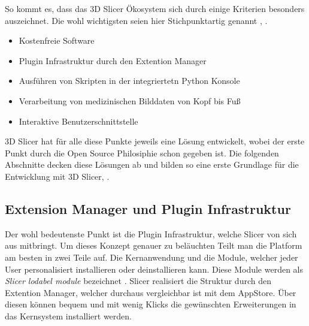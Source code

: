 So kommt es, dass das 3D Slicer Ökosystem sich durch einige Kriterien besonders
auszeichnet. Die wohl wichtigsten seien hier Stichpunktartig genannt \citep[vgl.][]{slicer2024},
\citep[vgl.][]{fedorov2012slicer}.

\begin{itemize}
	\item Kostenfreie Software

	\item Plugin Infrastruktur durch den Extention Manager

	\item Ausführen von Skripten in der integriertetn Python Konsole

	\item Verarbeitung von medizinischen Bilddaten von Kopf bis Fuß

	\item Interaktive Benutzerschnittstelle
\end{itemize}

3D Slicer hat für alle diese Punkte jeweils eine Lösung entwickelt, wobei der
erste Punkt durch die Open Source Philosiphie schon gegeben ist. Die folgenden Abschnitte
decken diese Lösungen ab und bilden so eine erste Grundlage für die Entwicklung mit
3D Slicer\citep[vgl.][]{slicer2024}, \citep[vgl.][]{fedorov2012slicer}.

\subsection{Extension Manager und Plugin Infrastruktur}
Der wohl bedeutenste Punkt ist die Plugin Infrastruktur, welche Slicer von sich
aus mitbringt. Um dieses Konzept genauer zu beläuchten Teilt man die Platform am
besten in zwei Teile auf. Die Kernanwendung und die Module, welcher jeder User personalisiert
installieren oder deinstallieren kann. Diese Module werden als \textit{Slicer
lodabel module} bezeichnet \citep[vgl.][Seite 1332]{fedorov2012slicer}. Slicer
realisiert die Struktur durch den Extention Manager, welcher durchaus vergleichbar
ist mit dem AppStore. Über diesen können bequem und mit wenig Klicks die
gewünschten Erweiterungen in das Kernsystem installiert werden.


